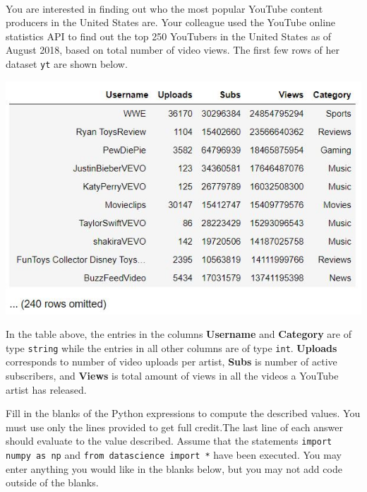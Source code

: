  \\ 

You are interested in finding out who the most popular YouTube content producers in the United States are. Your colleague used the YouTube online statistics API to find out the top 250 YouTubers in the United States as of August 2018, based on total number of video views. The first few rows of her dataset {\tt yt} are shown below. 

\begin{center}
\includegraphics[scale=0.9]{yt_with_reviews.JPG}
\end{center}

In the table above, the entries in the columns \textbf{Username} and \textbf{Category} are of type {\tt string} while the entries in all other columns are of type {\tt int}. \textbf{Uploads} corresponds to number of video uploads per artist, \textbf{Subs} is number of active subscribers, and \textbf{Views} is total amount of views in all the videos a YouTube artist has released.

Fill in the blanks of the Python expressions to compute the described values. You must use only the lines provided to get full credit.The  last  line  of  each  answer  should  evaluate  to  the  value described.   Assume  that  the  statements {\tt import numpy as np} and {\tt from datascience import *} have  been executed.  You may enter anything you would like in the blanks below, but you may not add code outside of the blanks.

